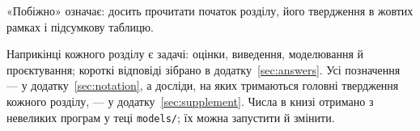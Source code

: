«Побіжно» означає: досить прочитати початок розділу, його твердження в жовтих рамках і підсумкову таблицю.

Наприкінці кожного розділу є задачі: оцінки, виведення, моделювання й проєктування; короткі відповіді зібрано в додатку~\ref{sec:answers}. Усі позначення --- у додатку~\ref{sec:notation}, а досліди, на яких тримаються головні твердження кожного розділу, --- у додатку~\ref{sec:supplement}. Числа в книзі отримано з невеликих програм у теці \texttt{models/}; їх можна запустити й змінити.
